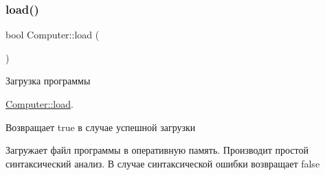 \subsubsection{\texorpdfstring{load()}{load()}}
{\footnotesize\ttfamily bool Computer\+::load (\begin{DoxyParamCaption}{ }\end{DoxyParamCaption})\hspace{0.3cm}{\ttfamily [private]}}



Загрузка программы 

\hyperlink{class_computer_adeb4bbeee2b9c13616dc8c4ef52cbe60}{Computer\+::load}.

\begin{DoxyReturn}{Возвращает}
true в случае успешной загрузки
\end{DoxyReturn}
Загружает файл программы в оперативную память. Производит простой синтаксический анализ. В случае синтаксической ошибки возвращает false 
